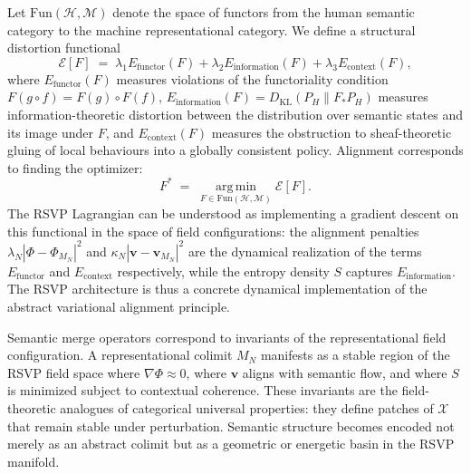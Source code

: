 \documentclass[12pt]{article}
\theoremstyle{definition}
\begin{document}
Let $\mathrm{Fun}(\mathcal{H}, \mathcal{M})$ denote the space of functors from
the human semantic category to the machine representational category. We define
a structural distortion functional
\begin{equation}
  \mathcal{E}[F]
  \;=\;
  \lambda_1 E_{\mathrm{functor}}(F)
  + \lambda_2 E_{\mathrm{information}}(F)
  + \lambda_3 E_{\mathrm{context}}(F),
\end{equation}
where $E_{\mathrm{functor}}(F)$ measures violations of the functoriality
condition $F(g \circ f) = F(g) \circ F(f)$, $E_{\mathrm{information}}(F) =
D_{\mathrm{KL}}(P_H \| F_* P_H)$ measures information-theoretic distortion
between the distribution over semantic states and its image under $F$, and
$E_{\mathrm{context}}(F)$ measures the obstruction to sheaf-theoretic gluing
of local behaviours into a globally consistent policy. Alignment corresponds to
finding the optimizer:
\begin{equation}\label{eq:variational}
  F^{*} \;=\; \operatorname*{arg\,min}_{F \in \mathrm{Fun}(\mathcal{H},\mathcal{M})}
  \mathcal{E}[F].
\end{equation}
The RSVP Lagrangian can be understood as implementing a gradient descent on
this functional in the space of field configurations: the alignment penalties
$\lambda_N |\Phi - \Phi_{M_N}|^2$ and $\kappa_N |\mathbf{v} - \mathbf{v}_{M_N}|^2$
are the dynamical realization of the terms $E_{\mathrm{functor}}$ and
$E_{\mathrm{context}}$ respectively, while the entropy density $S$ captures
$E_{\mathrm{information}}$. The RSVP architecture is thus a concrete dynamical
implementation of the abstract variational alignment principle.

Semantic merge operators correspond to invariants of the representational field
configuration. A representational colimit $M_N$ manifests as a stable region of
the RSVP field space where $\nabla\Phi \approx 0$, where $\mathbf{v}$ aligns
with semantic flow, and where $S$ is minimized subject to contextual coherence.
These invariants are the field-theoretic analogues of categorical universal
properties: they define patches of $\mathcal{X}$ that remain stable under
perturbation. Semantic structure becomes encoded not merely as an abstract
colimit but as a geometric or energetic basin in the RSVP manifold.
\end{document}
